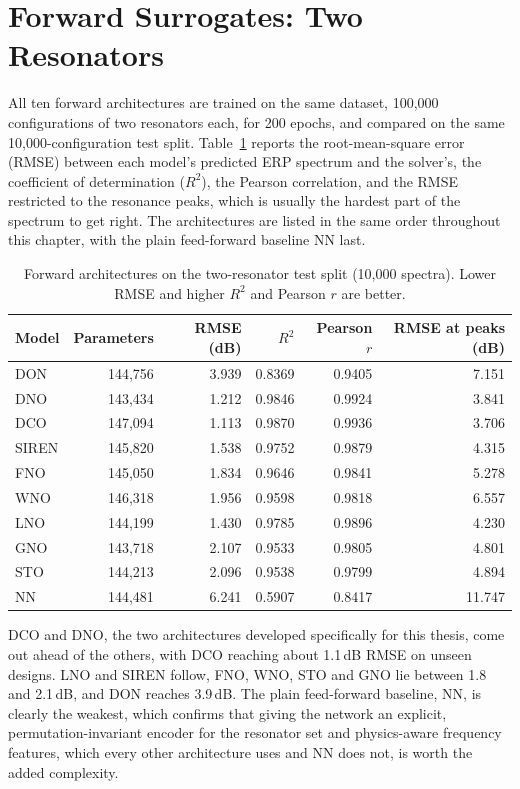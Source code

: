 \section{Forward Surrogates: Two Resonators}

All ten forward architectures are trained on the same dataset, 100{,}000 configurations of two resonators each, for 200 epochs, and compared on the same 10{,}000-configuration test split. Table~\ref{tab:forward-results} reports the root-mean-square error (RMSE) between each model's predicted ERP spectrum and the solver's, the coefficient of determination ($R^2$), the Pearson correlation, and the RMSE restricted to the resonance peaks, which is usually the hardest part of the spectrum to get right. The architectures are listed in the same order throughout this chapter, with the plain feed-forward baseline NN last.

\begin{table}[h]
\centering
\caption[Forward surrogate comparison on the test split]{Forward architectures on the two-resonator test split (10{,}000 spectra). Lower RMSE and higher $R^2$ and Pearson $r$ are better.}
\label{tab:forward-results}
\begin{tabular}{lrrrrr}
\hline
Model & Parameters & RMSE (dB) & $R^2$ & Pearson $r$ & RMSE at peaks (dB) \\
\hline
DON   & 144{,}756 & 3.939 & 0.8369 & 0.9405 & 7.151 \\
DNO   & 143{,}434 & 1.212 & 0.9846 & 0.9924 & 3.841 \\
DCO   & 147{,}094 & 1.113 & 0.9870 & 0.9936 & 3.706 \\
SIREN & 145{,}820 & 1.538 & 0.9752 & 0.9879 & 4.315 \\
FNO   & 145{,}050 & 1.834 & 0.9646 & 0.9841 & 5.278 \\
WNO   & 146{,}318 & 1.956 & 0.9598 & 0.9818 & 6.557 \\
LNO   & 144{,}199 & 1.430 & 0.9785 & 0.9896 & 4.230 \\
GNO   & 143{,}718 & 2.107 & 0.9533 & 0.9805 & 4.801 \\
STO   & 144{,}213 & 2.096 & 0.9538 & 0.9799 & 4.894 \\
NN    & 144{,}481 & 6.241 & 0.5907 & 0.8417 & 11.747 \\
\hline
\end{tabular}
\end{table}

DCO and DNO, the two architectures developed specifically for this thesis, come out ahead of the others, with DCO reaching about 1.1\,dB RMSE on unseen designs. LNO and SIREN follow, FNO, WNO, STO and GNO lie between 1.8 and 2.1\,dB, and DON reaches 3.9\,dB. The plain feed-forward baseline, NN, is clearly the weakest, which confirms that giving the network an explicit, permutation-invariant encoder for the resonator set and physics-aware frequency features, which every other architecture uses and NN does not, is worth the added complexity.

